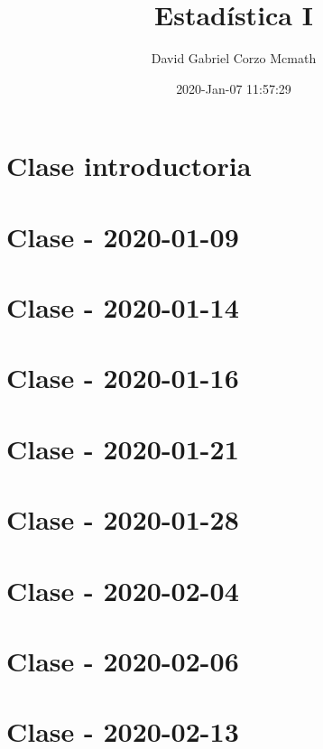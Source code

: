 \documentclass{book}
\title{Estadística I }
\author{David Gabriel Corzo Mcmath}
\date{2020-Jan-07 11:57:29}
\begin{document}
\maketitle
\tableofcontents

\chapter{Clase introductoria}


\chapter{Clase - 2020-01-09}


\chapter{Clase - 2020-01-14}


\chapter{Clase - 2020-01-16}


\chapter{Clase - 2020-01-21}


\chapter{Clase - 2020-01-28}


\chapter{Clase - 2020-02-04}


\chapter{Clase - 2020-02-06}


\chapter{Clase - 2020-02-13}

\end{document}
